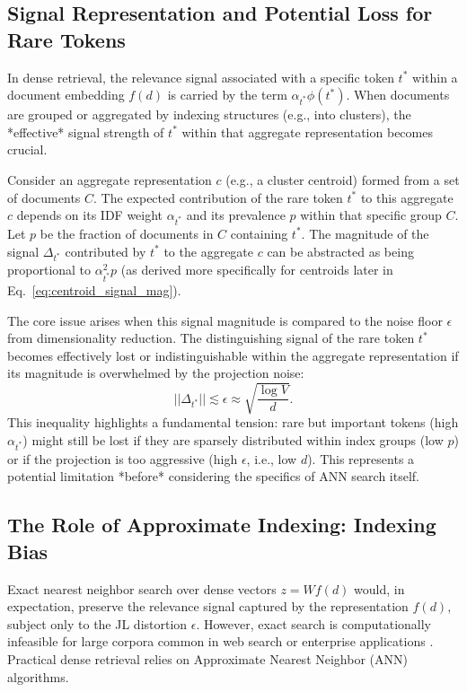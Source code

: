 \documentclass[manuscript]{acmart}
\begin{document}
\subsection{Signal Representation and Potential Loss for Rare Tokens} %

In dense retrieval, the relevance signal associated with a specific token $t^*$ within a document embedding $f(d)$ is carried by the term $\alpha_{t^*} \phi(t^*)$. When documents are grouped or aggregated by indexing structures (e.g., into clusters), the *effective* signal strength of $t^*$ within that aggregate representation becomes crucial.

Consider an aggregate representation $c$ (e.g., a cluster centroid) formed from a set of documents $C$. The expected contribution of the rare token $t^*$ to this aggregate $c$ depends on its IDF weight $\alpha_{t^*}$ and its prevalence $p$ within that specific group $C$. Let $p$ be the fraction of documents in $C$ containing $t^*$. The magnitude of the signal $\Delta_{t^*}$ contributed by $t^*$ to the aggregate $c$ can be abstracted as being proportional to $\alpha_{t^*}^2 p$ (as derived more specifically for centroids later in Eq.~\ref{eq:centroid_signal_mag}).

The core issue arises when this signal magnitude is compared to the noise floor $\epsilon$ from dimensionality reduction. The distinguishing signal of the rare token $t^*$ becomes effectively lost or indistinguishable within the aggregate representation if its magnitude is overwhelmed by the projection noise:
\begin{equation}
||\Delta_{t^*}|| \lesssim \epsilon \approx \sqrt{\frac{\log V}{d}}. \label{eq:signal_loss_general}
\end{equation}
This inequality highlights a fundamental tension: rare but important tokens (high $\alpha_{t^*}$) might still be lost if they are sparsely distributed within index groups (low $p$) or if the projection is too aggressive (high $\epsilon$, i.e., low $d$). This represents a potential limitation *before* considering the specifics of ANN search itself.

\subsection{The Role of Approximate Indexing: Indexing Bias} %

Exact nearest neighbor search over dense vectors $z = Wf(d)$ would, in expectation, preserve the relevance signal captured by the representation $f(d)$, subject only to the JL distortion $\epsilon$. However, exact search is computationally infeasible for large corpora common in web search or enterprise applications \cite{johnson2019billion}. Practical dense retrieval relies on Approximate Nearest Neighbor (ANN) algorithms.
\end{document}
